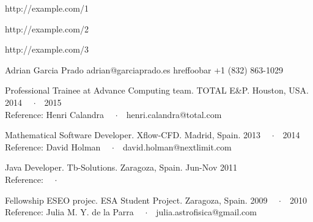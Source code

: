 


  http://example.com/1

  http://example.com/2

  http://example.com/3


Adrian Garcia Prado
adrian@garciaprado.es
href{foo}{bar}
+1 (832) 863-1029


Professional Trainee at Advance Computing team. TOTAL E&P. Houston, USA. 2014 \ \ $\cdotp$\ \ 2015 \\



Reference: Henri Calandra \ \ $\cdotp$\ \ henri.calandra@total.com

\Sep

Mathematical Software Developer. Xflow-CFD. Madrid, Spain. 2013 \ \ $\cdotp$\ \ 2014 \\



Reference: David Holman \ \ $\cdotp$\ \ david.holman@nextlimit.com

\Sep

Java Developer. Tb-Solutions. Zaragoza, Spain. Jun-Nov 2011 \\



Reference:  \ \ $\cdotp$\ \ 

\Sep

Fellowship ESEO projec. ESA Student Project. Zaragoza, Spain. 2009 \ \ $\cdotp$\ \ 2010 \\



Reference: Julia M. Y. de la Parra \ \ $\cdotp$\ \ julia.astrofisica@gmail.com

\Sep
